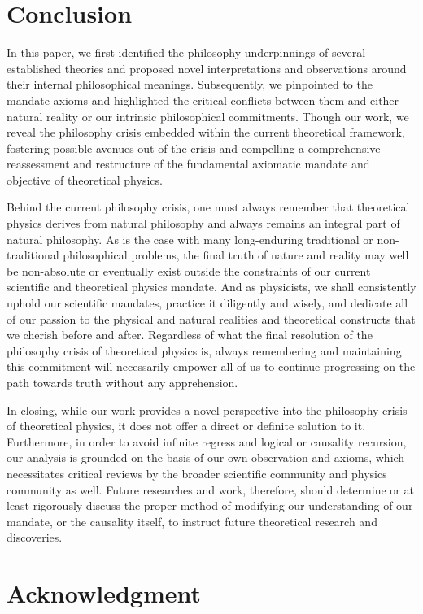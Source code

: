 \documentclass{article}
\begin{document}
\section{Conclusion}

In this paper, we first identified the philosophy underpinnings of several established theories and proposed novel interpretations and observations around their internal philosophical meanings. Subsequently, we pinpointed to the mandate axioms and highlighted the critical conflicts between them and either natural reality or our intrinsic philosophical commitments. Though our work, we reveal the philosophy crisis embedded within the current theoretical framework, fostering possible avenues out of the crisis and compelling a comprehensive reassessment and restructure of the fundamental axiomatic mandate and objective of theoretical physics.

Behind the current philosophy crisis, one must always remember that theoretical physics derives from natural philosophy and always remains an integral part of natural philosophy. As is the case with many long-enduring traditional or non-traditional philosophical problems, the final truth of nature and reality may well be non-absolute or eventually exist outside the constraints of our current scientific and theoretical physics mandate. \cite{cafiero2026} And as physicists, we shall consistently uphold our scientific mandates, practice it diligently and wisely, and dedicate all of our passion to the physical and natural realities and theoretical constructs that we cherish before and after. Regardless of what the final resolution of the philosophy crisis of theoretical physics is, always remembering and maintaining this commitment will necessarily empower all of us to continue progressing on the path towards truth without any apprehension.

In closing, while our work provides a novel perspective into the philosophy crisis of theoretical physics, it does not offer a direct or definite solution to it. Furthermore, in order to avoid infinite regress and logical or causality recursion, our analysis is grounded on the basis of our own observation and axioms, which necessitates critical reviews by the broader scientific community and physics community as well. Future researches and work, therefore, should determine or at least rigorously discuss the proper method of modifying our understanding of our mandate, or the causality itself, to instruct future theoretical research and discoveries.

\section{Acknowledgment}
\end{document}
